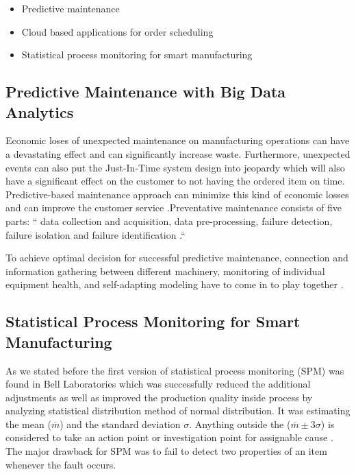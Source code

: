 \documentclass[sigconf]{acmart}
\begin{document}
\begin{itemize}
    \item Predictive maintenance \cite{KUMAR2017}
    \item Cloud based applications for order scheduling \cite{RUDOLPH2017412}
    \item Statistical process monitoring for smart manufacturing \cite{HE2017} 
\end{itemize}


\subsection{Predictive Maintenance with Big Data Analytics}
Economic loses of unexpected maintenance on manufacturing operations can have a devastating effect and can significantly increase waste. Furthermore, unexpected events can also put the Just-In-Time system design into jeopardy which will also have a significant effect on the customer to not having the ordered item on time. Predictive-based maintenance approach can minimize this kind of economic losses and can improve the customer service \cite{KUMAR2017}.Preventative maintenance consists of five parts: `` data collection and acquisition, data pre-processing, failure detection, failure isolation and failure identification \cite{KUMAR2017}.``

\par To achieve optimal decision for successful predictive maintenance, connection and information gathering between different machinery, monitoring of individual equipment health, and self-adapting modeling have to come in to play together \cite{HE2017}. 

\subsection{Statistical Process Monitoring for Smart Manufacturing}

As we stated before the first version of statistical process monitoring (SPM) was found in Bell Laboratories which was successfully reduced the additional adjustments as well as improved the production quality inside process by analyzing statistical distribution method of normal distribution. It was estimating the mean ($\overline{m}$) and the standard deviation $\sigma $. Anything outside the ($\overline{m}\pm 3\sigma$) is considered to take an action point or investigation point for assignable cause \cite{HE2017}. The major drawback for SPM was to fail to detect two properties of an item whenever the fault occurs.   
\end{document}
